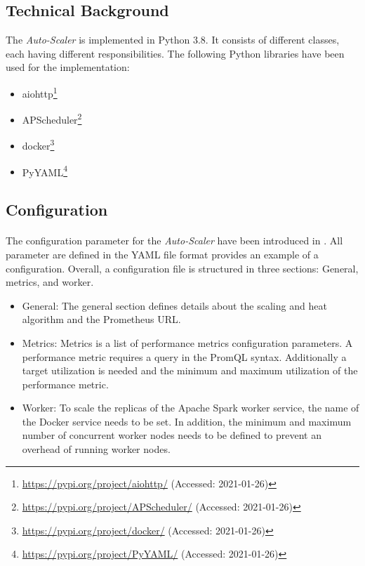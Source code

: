 \subsection{Technical Background}
The \textit{Auto-Scaler} is implemented in Python 3.8. It consists of different classes, each having different responsibilities.
The following Python libraries have been used for the implementation:
\begin{itemize}
\item aiohttp\footnote{\url{https://pypi.org/project/aiohttp/} (Accessed: 2021-01-26)}
\item APScheduler\footnote{\url{https://pypi.org/project/APScheduler/} (Accessed: 2021-01-26)}
\item docker\footnote{\url{https://pypi.org/project/docker/} (Accessed: 2021-01-26)}
\item PyYAML\footnote{\url{https://pypi.org/project/PyYAML/} (Accessed: 2021-01-26)}
\end{itemize}


\subsection{Configuration}
\paragraph{}The configuration parameter for the \textit{Auto-Scaler} have been introduced in .
All parameter are defined in the YAML file format
 provides an example of a configuration.
Overall, a configuration file is structured in three sections: General, metrics, and worker.
\begin{itemize}
\item General:
The general section defines details about the scaling and heat algorithm and the Prometheus URL.

\item Metrics:
Metrics is a list of performance metrics configuration parameters. A performance metric requires a query in the PromQL syntax. Additionally a target utilization is needed and the minimum and maximum utilization of the performance metric.

\item Worker:
To scale the replicas of the Apache Spark worker service, the name of the Docker service needs to be set. In addition, the minimum and maximum number of concurrent worker nodes needs to be defined to prevent an overhead of running worker nodes.
\end{itemize}

